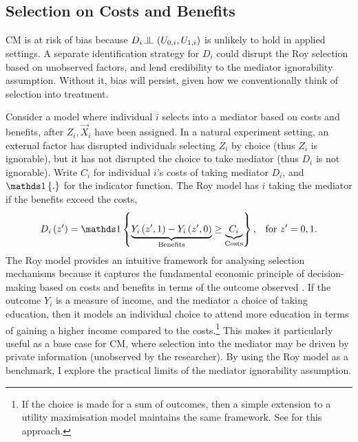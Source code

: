 \subsection{Selection on Costs and Benefits}
CM is at risk of bias because $D_i \indep  \left(U_{0, i}, U_{1, i} \right)$ is unlikely to hold in applied settings.
A separate identification strategy for $D_i$ could disrupt the Roy selection based on unobserved factors, and lend credibility to the mediator ignorability assumption.
Without it, bias will persist, given how we conventionally think of selection into treatment.

Consider a model where individual $i$ selects into a mediator based on costs and benefits, after $Z_i, \vec X_i$ have been assigned.
In a natural experiment setting, an external factor has disrupted individuals selecting $Z_i$ by choice (thus $Z_i$ is ignorable), but it has not disrupted the choice to take mediator (thus $D_i$ is not ignorable).
Write $C_i$ for individual $i$'s costs of taking mediator $D_i$, and $\indicator{.}$ for the indicator function.
The Roy model has $i$ taking the mediator if the benefits exceed the costs,
\begin{equation}
    \label{eqn:roy-model}
    D_i \left( z' \right) = \indicator{
    \underbrace{Y_i\left( z', 1 \right) - Y_i\left( z', 0 \right)}_{\text{Benefits}}
    \geq \underbrace{C_i}_{\text{Costs}}}, \;\;\; \text{for } z'=0,1.
\end{equation}
The Roy model provides an intuitive framework for analysing selection mechanisms because it captures the fundamental economic principle of decision-making based on costs and benefits in terms of the outcome observed \citep{roy1951some,heckman1990empirical}.
If the outcome $Y_i$ is a measure of income, and the mediator a choice of taking education, then it models an individual choice to attend more education in terms of gaining a higher income compared to the costs.\footnote{
    If the choice is made for a sum of outcomes, then a simple extension to a utility maximisation model maintains the same framework.
    See \cite{heckman1990empirical} for this approach.
}
This makes it particularly useful as a base case for CM, where selection into the mediator may be driven by private information (unobserved by the researcher).
By using the Roy model as a benchmark, I explore the practical limits of the mediator ignorability assumption.

